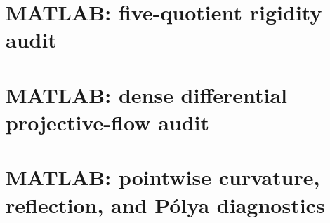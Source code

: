 \documentclass[11pt]{amsart}
\numberwithin{equation}{section}
\theoremstyle{plain}
\theoremstyle{definition}
\theoremstyle{remark}
\begin{document}
\appendix

\section{MATLAB: five-quotient rigidity audit}
\label{app:matlab-rigidity}


\section{MATLAB: dense differential projective-flow audit}
\label{app:matlab-flow}


\section{MATLAB: pointwise curvature, reflection, and Pólya diagnostics}
\label{app:matlab-reflection}

\end{document}
